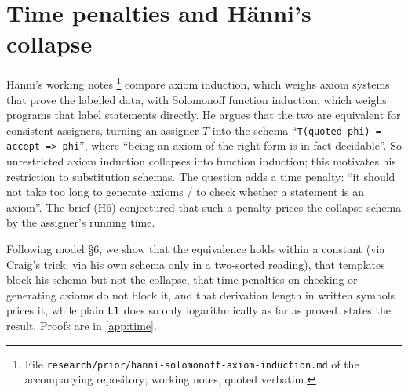 \section{Time penalties and H\"anni's collapse}\label{sec:time}

H\"anni's working notes \citep{hanni2026notes}\footnote{File \texttt{research/prior/hanni-solomonoff-axiom-induction.md} of the accompanying repository; working notes, quoted verbatim.} compare axiom induction, which weighs axiom systems that prove the labelled data, with Solomonoff function induction, which weighs programs that label statements directly. He argues that the two are equivalent for consistent assigners, turning an assigner $T$ into the schema ``\texttt{T(quoted-phi) = accept => phi}'', where ``being an axiom of the right form is in fact decidable''. So unrestricted axiom induction collapses into function induction; this motivates his restriction to substitution schemas. The question adds a time penalty: ``it should not take too long to generate axioms / to check whether a statement is an axiom''. The brief (H6) conjectured that such a penalty prices the collapse schema by the assigner's running time.

Following model \S6, we show that the equivalence holds within a constant (via Craig's trick; via his own schema only in a two-sorted reading), that templates block his schema but not the collapse, that time penalties on checking or generating axioms do not block it, and that derivation length in written symbols prices it, while plain $\mathord{\mathsf{L1}}$ does so only logarithmically as far as proved.  states the result. Proofs are in \cref{app:time}.

